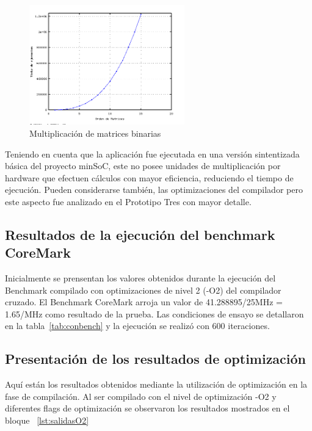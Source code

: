 \begin{figure}[h!]
 	\begin{center}
  	\includegraphics[width=0.6\textwidth,keepaspectratio=true]{./images/matrices}
  	\caption{Multiplicación de matrices binarias}
  	\label{fig:mulmat}
 	\end{center}
	\end{figure}

		Teniendo en cuenta que la aplicación fue ejecutada en una versión sintentizada básica del proyecto minSoC, este no posee unidades de multiplicación
		por hardware que efectuen cálculos con mayor eficiencia, reduciendo el tiempo de ejecución. Pueden considerarse también, las optimizaciones del
		compilador pero este aspecto fue analizado en el Prototipo Tres con mayor detalle. 	

		\subsection{Resultados de la ejecución del benchmark CoreMark}
		
Inicialmente se prensentan los valores obtenidos durante la ejecución del Benchmark compilado con optimizaciones de nivel 2 (-O2) del
compilador cruzado. El Benchmark CoreMark arroja un valor de  41.288895/25MHz = 1.65/MHz como resultado de la prueba. Las condiciones de ensayo se
detallaron en la tabla~\ref{tab:conbench} y la ejecución se realizó con 600 iteraciones. 


	\subsection {Presentación de los resultados de optimización} 
	
Aquí están los resultados obtenidos mediante la utilización de optimización en la fase de compilación. Al ser compilado con el nivel de optimización
-O2 y diferentes flags de optimización se observaron los resultados mostrados en el bloque ~\ref{lst:salidasO2}

